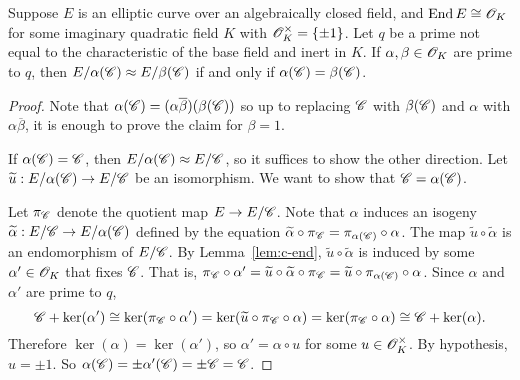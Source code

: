 \documentclass{amsart}
\begin{document}
\begin{lemma}\label{lem:c-subgps-distinct-quotients}
  Suppose $E$ is an elliptic curve over an algebraically closed field, and $\operatorname{End} E \cong \mathscr{O}_K$ for some imaginary quadratic field $K$ with $\mathscr{O}_K^\times = \{\pm 1\}$. Let $q$ be a prime not equal to the characteristic of the base field and inert in $K$. If $\alpha,\beta \in \mathscr{O}_K$ are prime to $q$, then $E/\alpha(\mathscr{C}) \approx E/\beta(\mathscr{C})$ if and only if $\alpha(\mathscr{C}) = \beta(\mathscr{C})$.
\end{lemma}
\begin{proof}
  Note that $\alpha(\mathscr{C}) = (\alpha\overline{\beta})(\beta(\mathscr{C}))$ so up to replacing $\mathscr{C}$ with $\beta(\mathscr{C})$ and $\alpha$ with $\alpha\overline{\beta}$, it is enough to prove the claim for $\beta = 1$.

  If $\alpha(\mathscr{C}) = \mathscr{C}$, then $E/\alpha(\mathscr{C}) \approx E/\mathscr{C}$, so it suffices to show the other direction. Let $\widetilde{u}: E/\alpha(\mathscr{C}) \to E/\mathscr{C}$ be an isomorphism. We want to show that $\mathscr{C} = \alpha(\mathscr{C})$.

  Let $\pi_{\mathscr{C}}$ denote the quotient map $E \to E/\mathscr{C}$. Note that $\alpha$ induces an isogeny $\widetilde{\alpha}: E/\mathscr{C} \to E/\alpha(\mathscr{C})$ defined by the equation $\widetilde{\alpha}\circ\pi_{\mathscr{C}} = \pi_{\alpha(\mathscr{C})} \circ \alpha$. The map $\tilde{u}\circ\tilde{\alpha}$ is an endomorphism of $E/\mathscr{C}$. By Lemma~\ref{lem:c-end}, $\tilde{u}\circ\tilde{\alpha}$ is induced by some $\alpha' \in \mathscr{O}_K$ that fixes $\mathscr{C}$. That is, $\pi_{\mathscr{C}}\circ\alpha' = \widetilde{u}\circ\widetilde{\alpha}\circ\pi_{\mathscr{C}} = \widetilde{u}\circ\pi_{\alpha(\mathscr{C})}\circ\alpha$. 
  Since $\alpha$ and $\alpha'$ are prime to $q$,
  \[
    \mathscr{C} + \ker(\alpha')
    \cong
    \ker(\pi_{\mathscr{C}} \circ \alpha')
    =
    \ker(\widetilde{u}\circ\pi_{\mathscr{C}}\circ\alpha)
    =
    \ker(\pi_{\mathscr{C}}\circ\alpha)
    \cong
    \mathscr{C} + \ker(\alpha).
  \]
  Therefore $\ker(\alpha) = \ker(\alpha')$, so $\alpha' = \alpha\circ u$ for some $u \in \mathscr{O}_K^\times$. By hypothesis, $u = \pm 1$. So $\alpha(\mathscr{C}) = \pm\alpha'(\mathscr{C}) = \pm\mathscr{C} = \mathscr{C}$.

\end{proof}
\end{document}
